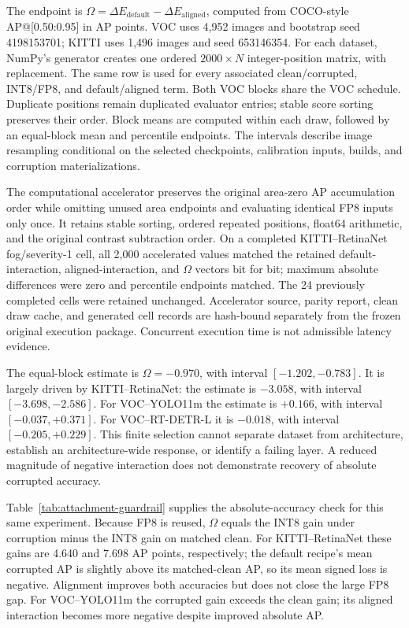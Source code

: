 \documentclass[10pt]{article}
\begin{document}
The endpoint is $\Omega=\Delta E_{\mathrm{default}}-\Delta E_{\mathrm{aligned}}$, computed from COCO-style AP@[0.50:0.95] in AP points. VOC uses 4,952 images and bootstrap seed 4198153701; KITTI uses 1,496 images and seed 653146354. For each dataset, NumPy's generator creates one ordered $2000\times N$ integer-position matrix, with replacement. The same row is used for every associated clean/corrupted, INT8/FP8, and default/aligned term. Both VOC blocks share the VOC schedule. Duplicate positions remain duplicated evaluator entries; stable score sorting preserves their order. Block means are computed within each draw, followed by an equal-block mean and percentile endpoints. The intervals describe image resampling conditional on the selected checkpoints, calibration inputs, builds, and corruption materializations.

The computational accelerator preserves the original area-zero AP accumulation order while omitting unused area endpoints and evaluating identical FP8 inputs only once. It retains stable sorting, ordered repeated positions, float64 arithmetic, and the original contrast subtraction order. On a completed KITTI--RetinaNet fog/severity-1 cell, all 2,000 accelerated values matched the retained default-interaction, aligned-interaction, and $\Omega$ vectors bit for bit; maximum absolute differences were zero and percentile endpoints matched. The 24 previously completed cells were retained unchanged. Accelerator source, parity report, clean draw cache, and generated cell records are hash-bound separately from the frozen original execution package. Concurrent execution time is not admissible latency evidence.

The equal-block estimate is $\Omega=-0.970$, with interval $[-1.202,-0.783]$. It is largely driven by KITTI--RetinaNet: the estimate is $-3.058$, with interval $[-3.698,-2.586]$. For VOC--YOLO11m the estimate is $+0.166$, with interval $[-0.037,+0.371]$. For VOC--RT-DETR-L it is $-0.018$, with interval $[-0.205,+0.229]$. This finite selection cannot separate dataset from architecture, establish an architecture-wide response, or identify a failing layer. A reduced magnitude of negative interaction does not demonstrate recovery of absolute corrupted accuracy.

Table~\ref{tab:attachment-guardrail} supplies the absolute-accuracy check for this same experiment. Because FP8 is reused, $\Omega$ equals the INT8 gain under corruption minus the INT8 gain on matched clean. For KITTI--RetinaNet these gains are 4.640 and 7.698 AP points, respectively; the default recipe's mean corrupted AP is slightly above its matched-clean AP, so its mean signed loss is negative. Alignment improves both accuracies but does not close the large FP8 gap. For VOC--YOLO11m the corrupted gain exceeds the clean gain; its aligned interaction becomes more negative despite improved absolute AP.
\end{document}
